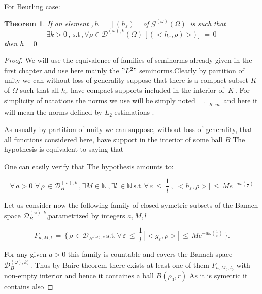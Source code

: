 \documentclass[12pt,a4paper]{amsart}
\newcommand{\NN}{\mathbb N}
\newtheorem{theorem}{Theorem}[section]
\begin{document}
 
 For Beurling case:

\begin{theorem}
     If an element ,$ \,h \,=\, [(h_\varepsilon)]\,$ of
 $\mathcal{G}^{(\omega)}(\Omega) \,$ is such that 
 $$\exists k>0\,,\,\mbox{s.t}\,,\forall \rho 
 \in \mathcal{D}^{(\omega),k}(\Omega)\,
 [(<h_\varepsilon,\rho)>)]\,=\,0\,$$
 then $h=0$
\end{theorem}

\begin{proof}
We will use the equivalence of families of seminorms already given in the first chapter and use here mainly the
$"L^2" $ seminorms.Clearly by partition of unity we can without loss of generality suppose that there is a compact subset $K$ of $\Omega$ such that all 
$h_\varepsilon$ have compact supports included in the interior of $\,K\,.$ For simplicity of natations the norms we use will be simply noted $\,|| .||_{K,m}\,$ and here it will mean the norms defined  by $L_2$  estimations .

As usually by partition of unity we can suppose, without loss of generality, that all functions considered here, have support in the interior of some ball $B$
 The hypothesis is equivalent to saying that 
 
 

 One can easily verify that The hypothesis amounts to: 

 
 \begin{equation*}
\forall \,a>0\,\,\forall\,\rho \, \in \mathcal{D}_B^{(\omega),k}\,,
\exists M\in\NN \, ,\exists l \,\in \NN\,\mbox{s.t.}\,
\forall \,\varepsilon \,\leq\,\frac{1}{l}\,,
 |<h_\varepsilon,\rho>|\,\leq\,
 Me^{-a\omega(\frac{1}{\varepsilon})}
 \end{equation*}
 
 Let us consider now the following  family of closed symetric subsets of the Banach space
  $\mathcal{D}_B^{(\omega),k}$,parametrized by integers $a,M,l$
 
$$F_{a,M,l} \,=\, \{\, \rho \, \in \mathcal{D}_{B^{(\omega),k}} \, \mbox{s.t.}\,\forall \,\varepsilon \,\leq\,\frac{1}{l}\, |<g_\varepsilon, \rho>| \,\leq\, M  e^{-a\omega(\frac{1}{\varepsilon})}\, \}.$$
 
 
 For any given $a>0$ this family is countable and covers the 
 Banach space $\mathcal{D}_B^{(\omega),k)}\,$.
 Thus by Baire theorem there exists at least one of them
 $F_{a,M_0,l_0}$ with non-empty interior and hence it containes a ball $B(\rho_0 , r)$ As it is symetric it contains also 


\end{proof}
\end{document}
